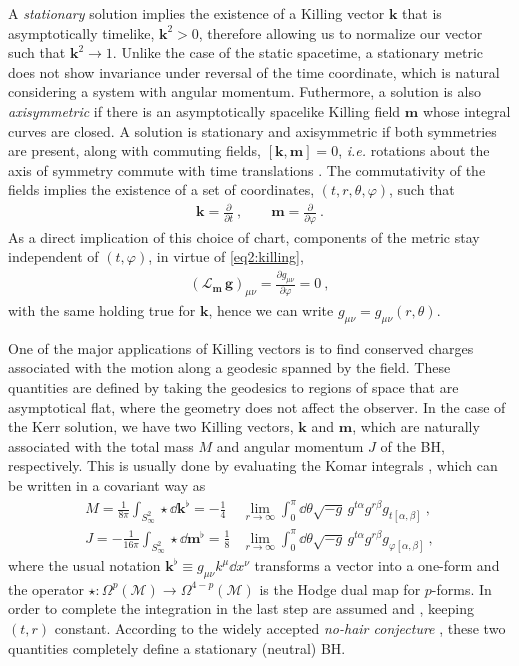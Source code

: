 A \emph{stationary} solution implies the existence of a Killing vector $\bm{k}$ that is asymptotically timelike, $\bm{k}^2>0$, therefore allowing us to normalize our vector such that $\bm{k}^2 \rightarrow 1$. 
Unlike the case of the static spacetime, a stationary metric does not show invariance under reversal of the time coordinate, which is natural considering a system with angular momentum. 
Futhermore, a solution is also \emph{axisymmetric} if there is an asymptotically spacelike Killing field $\bm{m}$ whose integral curves are closed.
A solution is stationary and axisymmetric if both symmetries are present, along with commuting fields, $[\bm{k} , \bm{m}] = 0$, \emph{i.e.} rotations about the axis of symmetry commute with time translations \cite{Wald2010}. The commutativity of the fields implies the existence of a set of coordinates, $(t,r,\theta,\varphi)$, such that
\begin{align}
    \bm{k} = \frac{\partial}{\partial t} ~, \qquad \bm{m} = \frac{\partial}{\partial \varphi} ~.
    \label{eq2:tPhiKilling}
\end{align}
As a direct implication of this choice of chart, components of the metric stay independent of $(t,\varphi)$, in virtue of \eqref{eq2:killing},
\begin{align}
    \left(\mathscr{L}_{\bm{m}} \,\bm{g} \right)_{\mu\nu} = \frac{\partial g_{\mu\nu}}{\partial \varphi} = 0 ~,
    \label{eq2:lieMetricTPhi}
\end{align}
with the same holding true for $\bm{k}$, hence we can write $g_{\mu\nu} = g_{\mu\nu}(r,\theta)$. 

One of the major applications of Killing vectors is to find conserved charges associated with the motion along a geodesic spanned by the field.
These quantities are defined by taking the geodesics to regions of space that are asymptotical flat, where the geometry does not affect the observer.
In the case of the Kerr solution, we have two Killing vectors, $\bm{k}$ and $\bm{m}$, which are naturally associated with the total mass $M$ and angular momentum $J$ of the BH, respectively.
This is usually done by evaluating the Komar integrals \cite{Heusler1996, Townsend1997}, which can be written in a covariant way as
\begin{align}
    M = \frac{1}{8 \pi} \int_{S^2_\infty} \star \dd \bm{k}^\flat  =  -\frac{1}{4}& \lim_{r\to\infty}  \int_0^\pi \dd\theta \sqrt{-g} \, g^{t\alpha} g^{r\beta} g_{t[\alpha,\beta]} ~, \label{eq2:komarMass} \\
    J = -\frac{1}{16 \pi} \int_{S^2_\infty} \star \dd \bm{m}^\flat = \frac{1}{8}& \lim_{r\to\infty}  \int_0^\pi \dd\theta \sqrt{-g} \, g^{t\alpha} g^{r\beta} g_{\varphi[\alpha,\beta]} ~, \label{eq2:komarSpin}
\end{align}
where the usual notation $\bm{k}^\flat \equiv g_{\mu\nu} k^\mu \dd x^\nu$ transforms a vector into a one-form and the operator $\star : \Omega^{p}(\mathscr{M})\to\Omega^{4-p}(\mathscr{M})$ is the Hodge dual map for $p$-forms.
In order to complete the integration in the last step are assumed  and , keeping $(t,r)$ constant. 
According to the widely accepted \emph{no-hair conjecture} \cite{Carter1971}, these two quantities completely define a stationary (neutral) BH. 

